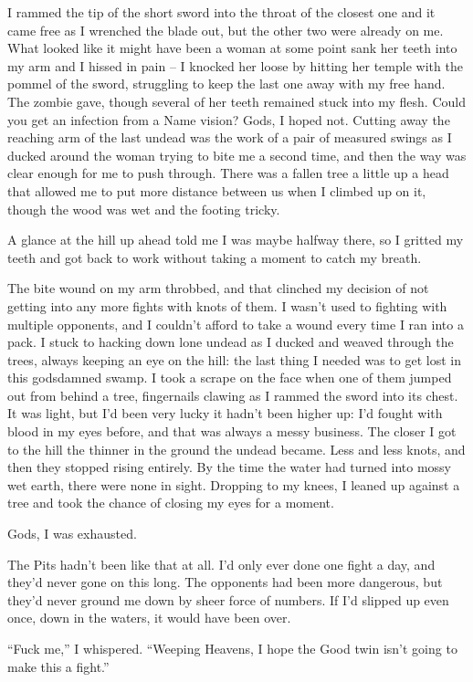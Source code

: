 \documentclass[12pt, openany]{book}
\begin{document}
I rammed the tip of the short sword into the throat of the closest one and it came free as I wrenched the blade out, but the other two were already on me. What looked like it might have been a woman at some point sank her teeth into my arm and I hissed in pain – I knocked her loose by hitting her temple with the pommel of the sword, struggling to keep the last one away with my free hand. The zombie gave, though several of her teeth remained stuck into my flesh. Could you get an infection from a Name vision? Gods, I hoped not. Cutting away the reaching arm of the last undead was the work of a pair of measured swings as I ducked around the woman trying to bite me a second time, and then the way was clear enough for me to push through. There was a fallen tree a little up a head that allowed me to put more distance between us when I climbed up on it, though the wood was wet and the footing tricky.

A glance at the hill up ahead told me I was maybe halfway there, so I gritted my teeth and got back to work without taking a moment to catch my breath. 

The bite wound on my arm throbbed, and that clinched my decision of not getting into any more fights with knots of them. I wasn’t used to fighting with multiple opponents, and I couldn’t afford to take a wound every time I ran into a pack. I stuck to hacking down lone undead as I ducked and weaved through the trees, always keeping an eye on the hill: the last thing I needed was to get lost in this godsdamned swamp. I took a scrape on the face when one of them jumped out from behind a tree, fingernails clawing as I rammed the sword into its chest. It was light, but I’d been very lucky it hadn’t been higher up: I’d fought with blood in my eyes before, and that was always a messy business. The closer I got to the hill the thinner in the ground the undead became. Less and less knots, and then they stopped rising entirely. By the time the water had turned into mossy wet earth, there were none in sight. Dropping to my knees, I leaned up against a tree and took the chance of closing my eyes for a moment.

Gods, I was exhausted.

The Pits hadn’t been like that at all. I’d only ever done one fight a day, and they’d never gone on this long. The opponents had been more dangerous, but they’d never ground me down by sheer force of numbers. If I’d slipped up even once, down in the waters, it would have been over. 

“Fuck me,” I whispered. “Weeping Heavens, I hope the Good twin isn’t going to make this a fight.” 
\end{document}
